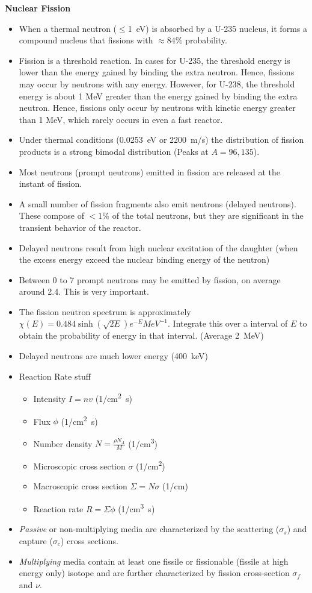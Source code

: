 \documentclass[a4paper]{article}
\begin{document}
\textbf{Nuclear Fission}
\begin{itemize}
    \item When a thermal neutron ($\leq$\SI{1}{eV}) is absorbed by a U-235 nucleus, it forms a compound nucleus that fissions with $\approx84\%$ probability.
    \item Fission is a threshold reaction. In cases for U-235, the threshold energy is lower than the energy gained by binding the extra neutron. Hence, fissions may occur by neutrons with any energy. However, for U-238, the threshold energy is about 1 MeV greater than the energy gained by binding the extra neutron. Hence, fissions only occur by neutrons with kinetic energy greater than 1 MeV, which rarely occurs in even a fast reactor.
    \item Under thermal conditions (\SI{0.0253}{eV} or \SI{2200}{m/s}) the distribution of fission products is a strong bimodal distribution (Peaks at $A=96,135$).
    \item Most neutrons (prompt neutrons) emitted in fission are released at the instant of fission.
    \item A small number of fission fragments also emit neutrons (delayed neutrons). These compose of $<1\%$ of the total neutrons, but they are significant in the transient behavior of the reactor. 
    \item Delayed neutrons result from high nuclear excitation of the daughter (when the excess energy exceed the nuclear binding energy of the neutron)
    \item Between 0 to 7 prompt neutrons may be emitted by fission, on average around 2.4. This is very important.
    \item The fission neutron spectrum is approximately $\chi(E)=0.484\sinh(\sqrt{2E})e^{-E}\si{MeV}^{-1}$. Integrate this over a interval of $E$ to obtain the probability of energy in that interval. (Average \SI{2}{MeV})
    \item Delayed neutrons are much lower energy (\SI{400}{keV})
    \item Reaction Rate stuff
    \begin{itemize}
        \item Intensity $I=nv$ (\si{1/cm^2s})
        \item Flux $\phi$ (\si{1/cm^2s})
        \item Number density $N=\frac{\rho N_A}{M}$ (\si{1/cm^3})
        \item Microscopic cross section $\sigma$ (\si{1/cm^2})
        \item Macroscopic cross section $\Sigma=N\sigma$ (\si{1/cm})
        \item Reaction rate $R=\Sigma\phi$ (\si{1/cm^3s})
    \end{itemize}
    \item \textit{Passive} or non-multiplying media are characterized by the scattering ($\sigma_s$) and capture ($\sigma_c$) cross sections.
    \item \textit{Multiplying} media contain at least one fissile or fissionable (fissile at high energy only) isotope and are further characterized by fission cross-section $\sigma_f$ and $\nu$.
\end{itemize}
\end{document}
